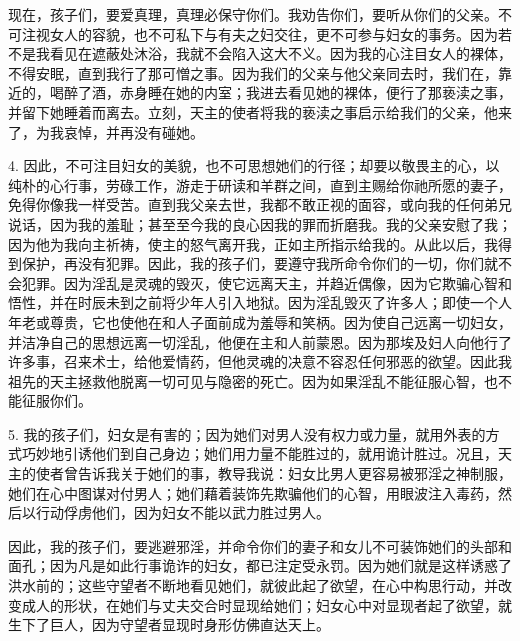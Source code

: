 现在，孩子们，要爱真理，真理必保守你们。我劝告你们，要听从你们的父亲。不可注视女人的容貌，也不可私下与有夫之妇交往，更不可参与妇女的事务。因为若不是我看见在遮蔽处沐浴，我就不会陷入这大不义。因为我的心注目女人的裸体，不得安眠，直到我行了那可憎之事。因为我们的父亲与他父亲同去时，我们在，靠近的，喝醉了酒，赤身睡在她的内室；我进去看见她的裸体，便行了那亵渎之事，并留下她睡着而离去。立刻，天主的使者将我的亵渎之事启示给我们的父亲，他来了，为我哀悼，并再没有碰她。\par

4. 因此，不可注目妇女的美貌，也不可思想她们的行径；却要以敬畏主的心，以纯朴的心行事，劳碌工作，游走于研读和羊群之间，直到主赐给你祂所愿的妻子，免得你像我一样受苦。直到我父亲去世，我都不敢正视的面容，或向我的任何弟兄说话，因为我的羞耻；甚至至今我的良心因我的罪而折磨我。我的父亲安慰了我；因为他为我向主祈祷，使主的怒气离开我，正如主所指示给我的。从此以后，我得到保护，再没有犯罪。因此，我的孩子们，要遵守我所命令你们的一切，你们就不会犯罪。因为淫乱是灵魂的毁灭，使它远离天主，并趋近偶像，因为它欺骗心智和悟性，并在时辰未到之前将少年人引入地狱。因为淫乱毁灭了许多人；即使一个人年老或尊贵，它也使他在和人子面前成为羞辱和笑柄。因为使自己远离一切妇女，并洁净自己的思想远离一切淫乱，他便在主和人前蒙恩。因为那埃及妇人向他行了许多事，召来术士，给他爱情药，但他灵魂的决意不容忍任何邪恶的欲望。因此我祖先的天主拯救他脱离一切可见与隐密的死亡。因为如果淫乱不能征服心智，也不能征服你们。\par

5. 我的孩子们，妇女是有害的；因为她们对男人没有权力或力量，就用外表的方式巧妙地引诱他们到自己身边；她们用力量不能胜过的，就用诡计胜过。况且，天主的使者曾告诉我关于她们的事，教导我说：妇女比男人更容易被邪淫之神制服，她们在心中图谋对付男人；她们藉着装饰先欺骗他们的心智，用眼波注入毒药，然后以行动俘虏他们，因为妇女不能以武力胜过男人。\par

因此，我的孩子们，要逃避邪淫，并命令你们的妻子和女儿不可装饰她们的头部和面孔；因为凡是如此行事诡诈的妇女，都已注定受永罚。因为她们就是这样诱惑了洪水前的；这些守望者不断地看见她们，就彼此起了欲望，在心中构思行动，并改变成人的形状，在她们与丈夫交合时显现给她们；妇女心中对显现者起了欲望，就生下了巨人，因为守望者显现时身形仿佛直达天上。\par

